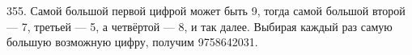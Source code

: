 355. Самой большой первой цифрой может быть 9, тогда самой большой второй --- 7, третьей --- 5, а четвёртой --- 8, и так далее. Выбирая каждый раз самую большую возможную цифру, получим 9758642031.\\
